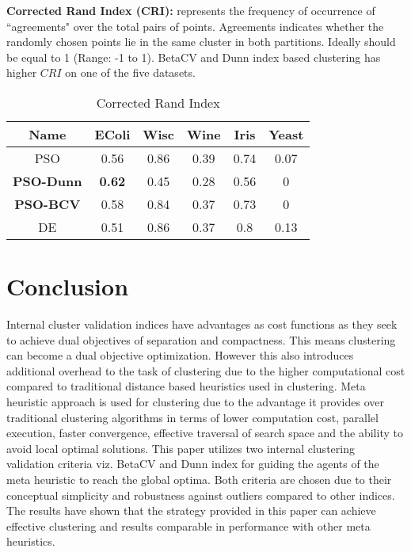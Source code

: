 \documentclass{svproc}
\begin{document}
\textbf{Corrected Rand Index (CRI): } represents the frequency of occurrence of ``agreements" over the total pairs of points. Agreements indicates whether the randomly chosen points lie in the same cluster in both partitions. Ideally should be equal to 1 (Range: -1 to 1). BetaCV and Dunn index based clustering has higher $CRI$ on one of the five datasets. 

\begin{table}[H]
\caption{Corrected Rand Index}
\label{asw}
\centering
\begin{tabular}{||c|c|c|c|c|c||}
  \hline
\multicolumn{1}{|c|}{\textbf{Name}} & \multicolumn{1}{c|}{\textbf{EColi}} & \multicolumn{1}{c|}{\textbf{Wisc}} & \multicolumn{1}{c|}{\textbf{Wine}} & \multicolumn{1}{c|}{\textbf{Iris}} & \multicolumn{1}{c|}{\textbf{Yeast}}\\
  \hline\hline
   PSO & 0.56 & 0.86 & 0.39 & 0.74 & 0.07 \\ [0.5ex]
   \hline
   \textbf{PSO-Dunn} & \textbf{0.62} & 0.45 & 0.28 & 0.56 & 0 \\
   \hline
  \textbf{PSO-BCV} & 0.58 & 0.84 & 0.37 & 0.73 & 0 \\
   \hline
  DE & 0.51 & 0.86 & 0.37 & 0.8 & 0.13 \\
   \hline
 
\end{tabular}
\end{table}


\section{Conclusion}
Internal cluster validation indices have advantages as cost functions as they seek to achieve dual objectives of separation and compactness. This means clustering can become a dual objective optimization. However this also introduces additional overhead to the task of clustering due to the higher computational cost compared to traditional distance based heuristics used in clustering. Meta heuristic approach is used for clustering due to the advantage it provides over traditional clustering algorithms in terms of lower computation cost, parallel execution, faster convergence, effective traversal of search space and the ability to avoid local optimal solutions. This paper utilizes two internal clustering validation criteria viz. BetaCV and Dunn index for guiding the agents of the meta heuristic to reach the global optima. Both criteria are chosen due to their conceptual simplicity and robustness against outliers compared to other indices. The results have shown that the strategy provided in this paper can achieve effective clustering and results comparable in performance with other meta heuristics.   



\end{document}
